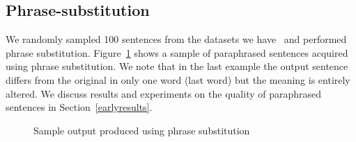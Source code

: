 \documentclass[11pt,letterpaper]{article}
\begin{document}
\subsection{Phrase-substitution}
We randomly sampled 100 sentences from the datasets we have~\cite{data1,data3} and performed phrase substitution. Figure~\ref{sample1} 
shows a sample of paraphrased sentences acquired using phrase substitution. We note that in the last example the output sentence differs from the original in only one word (last word) but the meaning is entirely altered. We discuss results and experiments on the quality of paraphrased sentences in Section~\ref{earlyresults}.
\newpage
\begin{figure}[h!]
\center
\caption{Sample output produced using phrase substitution}
\label{sample1}
\end{figure}
\end{document}
